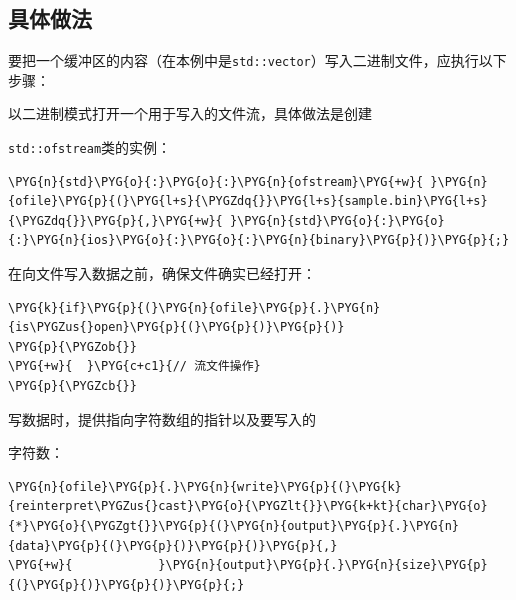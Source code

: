 
\subsection{具体做法}



要把一个缓冲区的内容（在本例中是\texttt{std::\allowbreak{}vector}）写入二进制文件，应执行以下步骤：



以二进制模式打开一个用于写入的文件流，具体做法是创建



\texttt{std::\allowbreak{}ofstream}类的实例：



\begin{codeblockbg}
\begin{Verbatim}[commandchars=\\\{\},breaklines=true,breakanywhere=true,fontsize=\codefont,xleftmargin=17bp]
\PYG{n}{std}\PYG{o}{:}\PYG{o}{:}\PYG{n}{ofstream}\PYG{+w}{ }\PYG{n}{ofile}\PYG{p}{(}\PYG{l+s}{\PYGZdq{}}\PYG{l+s}{sample.bin}\PYG{l+s}{\PYGZdq{}}\PYG{p}{,}\PYG{+w}{ }\PYG{n}{std}\PYG{o}{:}\PYG{o}{:}\PYG{n}{ios}\PYG{o}{:}\PYG{o}{:}\PYG{n}{binary}\PYG{p}{)}\PYG{p}{;}
\end{Verbatim}
\end{codeblockbg}



在向文件写入数据之前，确保文件确实已经打开：



\begin{codeblockbg}
\begin{Verbatim}[commandchars=\\\{\},breaklines=true,breakanywhere=true,fontsize=\codefont,xleftmargin=17bp]
\PYG{k}{if}\PYG{p}{(}\PYG{n}{ofile}\PYG{p}{.}\PYG{n}{is\PYGZus{}open}\PYG{p}{(}\PYG{p}{)}\PYG{p}{)}
\PYG{p}{\PYGZob{}}
\PYG{+w}{  }\PYG{c+c1}{// 流文件操作}
\PYG{p}{\PYGZcb{}}
\end{Verbatim}
\end{codeblockbg}



写数据时，提供指向字符数组的指针以及要写入的



字符数：



\begin{codeblockbg}
\begin{Verbatim}[commandchars=\\\{\},breaklines=true,breakanywhere=true,fontsize=\codefont,xleftmargin=17bp]
\PYG{n}{ofile}\PYG{p}{.}\PYG{n}{write}\PYG{p}{(}\PYG{k}{reinterpret\PYGZus{}cast}\PYG{o}{\PYGZlt{}}\PYG{k+kt}{char}\PYG{o}{*}\PYG{o}{\PYGZgt{}}\PYG{p}{(}\PYG{n}{output}\PYG{p}{.}\PYG{n}{data}\PYG{p}{(}\PYG{p}{)}\PYG{p}{)}\PYG{p}{,}
\PYG{+w}{            }\PYG{n}{output}\PYG{p}{.}\PYG{n}{size}\PYG{p}{(}\PYG{p}{)}\PYG{p}{)}\PYG{p}{;}
\end{Verbatim}
\end{codeblockbg}


